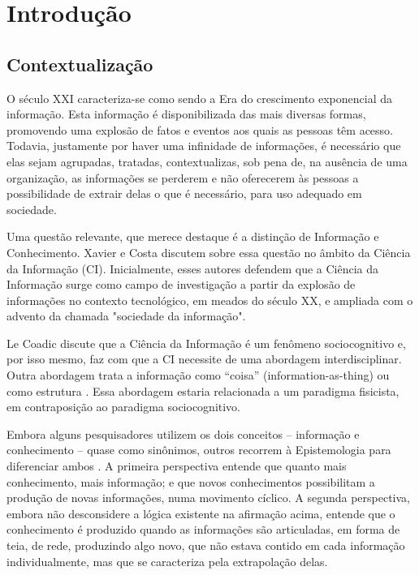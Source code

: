 \chapter{Introdução}\label{intro}

\section{Contextualização}\label{intro:problem}

O século XXI caracteriza-se como sendo a Era do crescimento exponencial da informação. Esta informação é disponibilizada das mais diversas formas, promovendo uma explosão de fatos e eventos aos quais as pessoas têm acesso. Todavia, justamente por haver uma infinidade de informações, é necessário que elas sejam agrupadas, tratadas, contextualizas, sob pena de, na ausência de uma organização, as informações se perderem e não oferecerem às pessoas a possibilidade de extrair delas o que é necessário, para uso adequado em sociedade.

Uma questão relevante, que merece destaque é a distinção de Informação e Conhecimento. Xavier e Costa \cite{xavier2011relaccoes} discutem sobre essa questão no âmbito da Ciência da Informação (CI). Inicialmente, esses autores defendem que a Ciência da Informação surge como campo de investigação a partir da explosão de informações no contexto tecnológico, em meados do século XX, e ampliada com o advento da chamada "sociedade da informação".

Le Coadic \cite{da1996coadic} discute que a Ciência da Informação é um fenômeno sociocognitivo e, por isso mesmo, faz com que a CI necessite de uma abordagem interdisciplinar. Outra abordagem trata a informação como ``coisa'' (information-as-thing) ou como estrutura \cite{xavier2011relaccoes}. Essa abordagem estaria relacionada a um paradigma fisicista, em contraposição ao paradigma sociocognitivo. 

Embora alguns pesquisadores utilizem os dois conceitos -- informação e conhecimento -- quase como sinônimos, outros recorrem à Epistemologia para diferenciar ambos \cite{xavier2011relaccoes}. A primeira perspectiva entende que quanto mais conhecimento, mais informação; e que novos conhecimentos possibilitam a produção de novas informações, numa movimento cíclico. A segunda perspectiva, embora não desconsidere a lógica existente na afirmação acima, entende que o conhecimento é produzido quando as informações são articuladas, em forma de teia, de rede, produzindo algo novo, que não estava contido em cada informação individualmente, mas que se caracteriza pela extrapolação delas.

